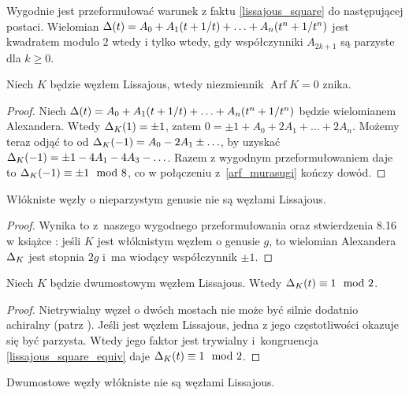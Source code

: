 Wygodnie jest przeformułować warunek z faktu \ref{lissajous_square} do następującej postaci.
Wielomian $\Delta(t) = A_0 + A_1(t+1/t) + \ldots + A_n(t^n + 1/t^n)$ jest kwadratem modulo $2$ wtedy i tylko wtedy, gdy współczynniki $A_{2k+1}$ są parzyste dla $k \ge 0$.

\begin{corollary}
    Niech $K$ będzie węzłem Lissajous, wtedy niezmiennik $\operatorname{Arf} K = 0$ znika.
\end{corollary}

\begin{proof}
    Niech $\Delta(t) = A_0 + A_1(t+1/t) + \ldots + A_n(t^n + 1/t^n)$ będzie  wielomianem Alexandera.
    Wtedy $\Delta_K(1) = \pm 1$, zatem $0 = \pm 1 + A_0 + 2A_1 + \ldots + 2A_n$.
    Możemy teraz odjąć to od $\Delta_K(-1) = A_0 - 2A_1 \pm \ldots$, by uzyskać $\Delta_K(-1) = \pm 1 - 4A_1 - 4A_3 - \ldots$.
    Razem z wygodnym przeformułowaniem daje to $\Delta_K(-1) \equiv \pm 1 \mod 8$, co w połączeniu z~\ref{arf_murasugi} kończy dowód.
\end{proof}

\begin{corollary}
	\label{lissajous_fiber}
    Włókniste węzły o nieparzystym genusie nie są węzłami Lissajous.
\end{corollary}

\begin{proof}
    Wynika to z~naszego wygodnego przeformułowania oraz stwierdzenia 8.16 w książce \cite{burde03}: jeśli $K$ jest włóknistym węzłem o genusie $g$, to wielomian Alexandera $\Delta_K$ jest stopnia $2g$ i~ma wiodący współczynnik $\pm 1$.
\end{proof}

\begin{corollary}
	\label{lissajous_twobridge}
    Niech $K$ będzie dwumostowym węzłem Lissajous.
    Wtedy $\Delta_K(t) \equiv 1 \mod 2$.
\end{corollary}

\begin{proof}
    Nietrywialny węzeł o dwóch mostach nie może być silnie dodatnio achiralny (patrz \cite{hartley79}).
    Jeśli jest węzłem Lissajous, jedna z jego częstotliwości okazuje się być parzysta.
    Wtedy jego faktor jest trywialny i~kongruencja \ref{lissajous_square_equiv} daje $\Delta_K(t) \equiv 1 \mod 2$.
\end{proof}

\begin{corollary}
    Dwumostowe węzły włókniste nie są węzłami Lissajous.
\end{corollary}

